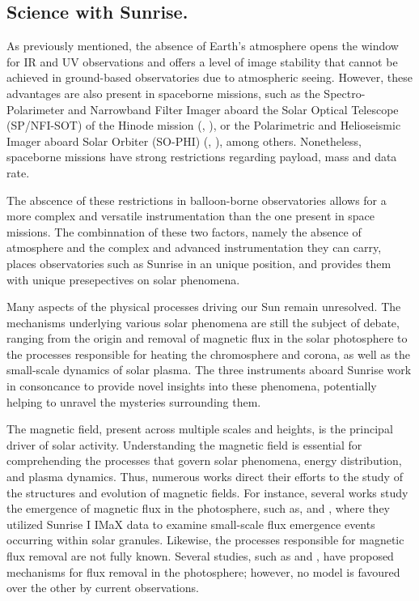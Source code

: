 \subsection{Science with Sunrise.}

As previously mentioned, the absence of Earth's atmosphere opens the window for IR and UV observations and offers a level of image stability that cannot be achieved in ground-based observatories due to atmospheric seeing. However, these advantages are also present in spaceborne missions, such as the Spectro-Polarimeter and Narrowband Filter Imager aboard the Solar Optical Telescope (SP/NFI-SOT) of the Hinode mission (\citealt{Hinode}, \citealt{sot}), or the Polarimetric and Helioseismic Imager aboard Solar Orbiter (SO-PHI) (\citealt{PHI}, \citealt{SO}), among others. Nonetheless, spaceborne missions have strong restrictions regarding payload, mass and data rate. 

The abscence of these restrictions in balloon-borne observatories allows for a more complex and versatile instrumentation than the one present in space missions. The combinnation of these two factors, namely the absence of atmosphere and the complex and advanced instrumentation they can carry, places observatories such as Sunrise in an unique position, and provides them with unique presepectives on solar phenomena.

Many aspects of the physical processes driving our Sun remain unresolved. The mechanisms underlying various solar phenomena are still the subject of debate, ranging from the origin and removal of magnetic flux in the solar photosphere to the processes responsible for heating the chromosphere and corona, as well as the small-scale dynamics of solar plasma. The three instruments aboard Sunrise work in consoncance to provide novel insights into these phenomena, potentially helping to unravel the mysteries surrounding them.

The magnetic field, present across multiple scales and heights, is the principal driver of solar activity. Understanding the magnetic field is essential for comprehending the processes that govern solar phenomena, energy distribution, and plasma dynamics. Thus, numerous works direct their efforts to the study of the structures and evolution of magnetic fields. For instance, several works study  the emergence of magnetic flux in the photosphere, such as, \cite{flux_emergence_1} and \cite{flux_emergence_2}, where they utilized Sunrise I IMaX data to examine small-scale flux emergence events occurring within solar granules. Likewise, the processes responsible for magnetic flux removal are not fully known. Several studies, such as \cite{flux_removal_1} and \cite{flux_emergence_2}, have proposed mechanisms for flux removal in the photosphere; however, no model is favoured over the other by current observations.

